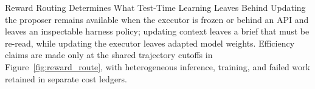 \vspace{2mm}
\begin{takeawaybox}{Reward Routing Determines What Test-Time Learning Leaves Behind}
Updating the proposer remains available when the executor is frozen or behind
an API and leaves an inspectable harness policy; updating context leaves a
brief that must be re-read, while updating the executor leaves adapted model
weights.  Efficiency claims are made only at the shared trajectory cutoffs in
Figure~\ref{fig:reward_route}, with heterogeneous inference, training, and
failed work retained in separate cost ledgers.
\end{takeawaybox}
\vspace{2mm}
